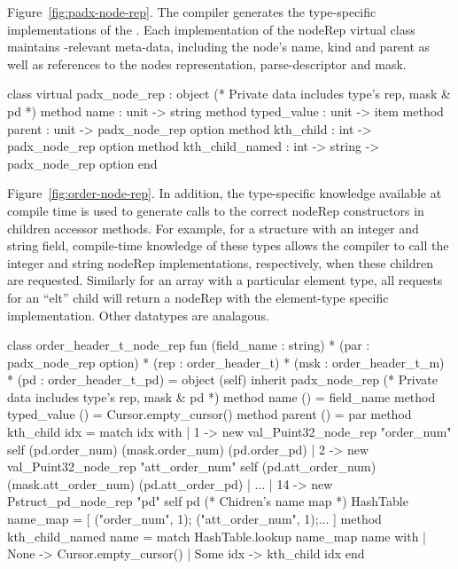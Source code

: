 Figure~\ref{fig:padx-node-rep}.
The \pads{} compiler generates the type-specific implementations of the
\padx \absdm.  Each
implementation of the nodeRep virtual class maintains \xml{}-relevant
meta-data, including the node's name, kind and parent as well as
references to the nodes representation, parse-descriptor and mask.  
\begin{figure*}
\begin{small}
\begin{code}
class virtual padx\_node\_rep :
  object 
    (* Private data includes type's rep, mask \& pd *)
    method name        : unit -> string
    method typed_value : unit -> item
    method parent      : unit -> padx\_node\_rep option
    method kth_child   : int -> padx\_node\_rep option
    method kth_child_named : int -> string -> padx\_node\_rep option
  end
\end{code}
\end{small}
\caption{The \padx{} abstract node representation}
\label{fig:padx-node-rep}
\end{figure*}

Figure~\ref{fig:order-node-rep}.
In
addition, the type-specific knowledge available at compile time is
used to generate calls to the correct nodeRep constructors in children
accessor methods.  For example, for a structure with an integer and
string field, compile-time knowledge of these types allows the
compiler to call the integer and string nodeRep implementations,
respectively, when these children are requested. Similarly for an
array with a particular element type, all requests for an ``elt''
child will return a nodeRep with the element-type specific
implementation. Other datatypes are analagous.
\begin{figure*}
\begin{small}
\begin{code}
class order\_header\_t\_node\_rep 
  fun (field\_name : string) * 
      (par : padx\_node\_rep option) * 
      (rep : order\_header\_t) * 
      (msk : order\_header\_t\_m) * 
      (pd : order\_header\_t\_pd) = 
  object (self) 
    inherit padx\_node\_rep
    (* Private data includes type's rep, mask \& pd *)
    method name        () = field\_name
    method typed_value () = Cursor.empty_cursor()
    method parent      () = par 
    method kth_child   idx = 
      match idx with 
      | 1 -> new val\_Puint32\_node\_rep "order\_num" self (pd.order\_num) (mask.order\_num) (pd.order\_pd) 
      | 2 -> new val\_Puint32\_node\_rep "att\_order\_num" self (pd.att\_order\_num) (mask.att\_order\_num) (pd.att\_order\_pd) 
      | ...
      | 14 -> new Pstruct\_pd\_node\_rep "pd" self pd
    (* Chidren's name map *)
    HashTable name_map = [ ("order\_num", 1); ("att\_order\_num", 1);... ]
    method kth_child_named name =
      match HashTable.lookup name\_map name with
      | None -> Cursor.empty_cursor()
      | Some idx -> kth_child idx 
  end
\end{code}
\end{small}
\caption{Fragment of compiler-generated node representation for order\_header\_t}
\label{fig:order-node-rep}
\end{figure*}

